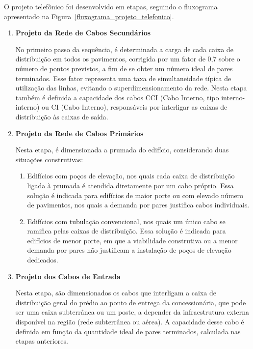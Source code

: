 \documentclass[12pt,openright,oneside,a4paper,brazil]{abntex2}
\begin{document}
O projeto telefônico foi desenvolvido em etapas, seguindo o fluxograma apresentado na Figura~\ref{fluxograma_projeto_telefonico}.

\begin{enumerate}
    \item \textbf{Projeto da Rede de Cabos Secundários}
    
    \hspace{1.27cm}No primeiro passo da sequência, é determinada a carga de cada caixa de distribuição em todos os pavimentos, corrigida por um fator de 0,7 sobre o número de pontos previstos, a fim de se obter um número ideal de pares terminados. Esse fator representa uma taxa de simultaneidade típica de utilização das linhas, evitando o superdimensionamento da rede. Nesta etapa também é definida a capacidade dos cabos CCI (Cabo Interno, tipo interno-interno) ou CI (Cabo Interno), responsáveis por interligar as caixas de distribuição às caixas de saída.

    \item \textbf{Projeto da Rede de Cabos Primários} 
    
    \hspace{1.27cm}Nesta etapa, é dimensionada a prumada do edifício, considerando duas situações construtivas:
    \begin{enumerate}[label=\alph*)]
        \item Edifícios com poços de elevação, nos quais cada caixa de distribuição ligada à prumada é atendida diretamente por um cabo próprio. Essa solução é indicada para edifícios de maior porte ou com elevado número de pavimentos, nos quais a demanda por pares justifica cabos individuais.
        \item Edifícios com tubulação convencional, nos quais um único cabo se ramifica pelas caixas de distribuição. Essa solução é indicada para edifícios de menor porte, em que a viabilidade construtiva ou a menor demanda por pares não justificam a instalação de poços de elevação dedicados.
    \end{enumerate}

    \item \textbf{Projeto dos Cabos de Entrada}
    
    \hspace{1.27cm}Nesta etapa, são dimensionados os cabos que interligam a caixa de distribuição geral do prédio ao ponto de entrega da concessionária, que pode ser uma caixa subterrânea ou um poste, a depender da infraestrutura externa disponível na região (rede subterrânea ou aérea). A capacidade desse cabo é definida em função da quantidade ideal de pares terminados, calculada nas etapas anteriores.



\end{enumerate}
\end{document}
